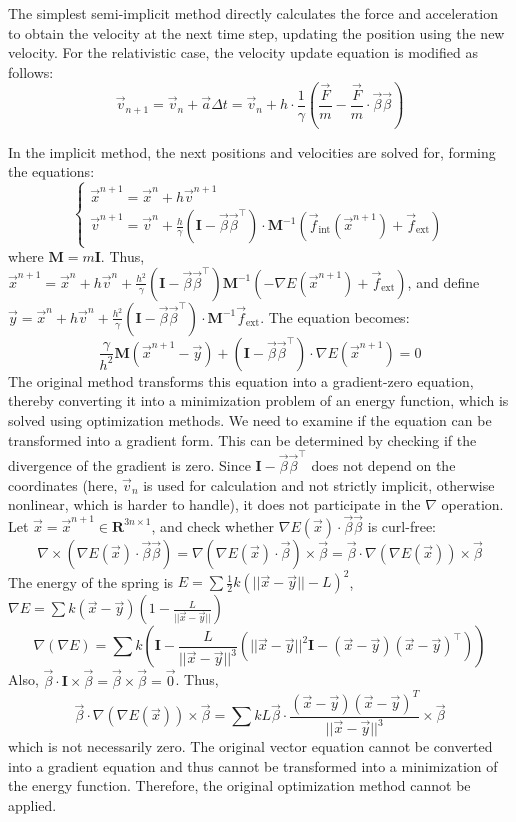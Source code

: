 \documentclass{article}
\begin{document}
The simplest semi-implicit method directly calculates the force and acceleration to obtain the velocity at the next time step, updating the position using the new velocity. For the relativistic case, the velocity update equation is modified as follows:
$$\vec{v}_{n+1} = \vec{v}_n + \vec{a} \Delta t = \vec{v}_n + h \cdot \frac{1} {\gamma} (\frac{\vec{F}} {m} - \frac{\vec{F}} {m} \cdot \vec{\beta} \vec{\beta})$$

In the implicit method, the next positions and velocities are solved for, forming the equations:
$$ \begin{cases} \vec{x}^{n+1} = \vec{x}^{n} + h \vec{v}^{n+1} \\ \vec{v}^{n+1} = \vec{v}^{n} + \frac{h}{\gamma} (\mathbf{I} - \vec{\beta} \vec{\beta}^\top) \cdot \mathbf{M}^{-1} (\vec{f} _ {\text{int}}(\vec{x}^{n+1}) + \vec{f}_{\text{ext}} ) \end{cases} $$
where $\mathbf{M} = m \mathbf{I}$. Thus, $ \vec{x}^{n+1} = \vec{x}^{n} + h \vec{v}^{n} + \frac{h^2}{\gamma} (\mathbf{I} - \vec{\beta} \vec{\beta}^\top) \mathbf{M}^{-1} (-\nabla E(\vec{x}^{n+1}) + \vec{f}_{\text{ext}} ) $, and define $\vec{y} = \vec{x}^n + h \vec{v}^n + \frac{h^2}{\gamma} (\mathbf{I} - \vec{\beta} \vec{\beta}^\top) \cdot \mathbf{M}^{-1} \vec{f}_{\text{ext}}$. The equation becomes:
$$ \frac{\gamma}{h^2} \mathbf{M} (\vec{x}^{n+1} - \vec{y}) + (\mathbf{I} - \vec{\beta} \vec{\beta}^\top) \cdot \nabla E(\vec{x}^{n+1}) = 0 $$
The original method transforms this equation into a gradient-zero equation, thereby converting it into a minimization problem of an energy function, which is solved using optimization methods. We need to examine if the equation can be transformed into a gradient form. This can be determined by checking if the divergence of the gradient is zero. Since $\mathbf{I} - \vec{\beta} \vec{\beta}^\top$ does not depend on the coordinates (here, $\vec{v}_n$ is used for calculation and not strictly implicit, otherwise nonlinear, which is harder to handle), it does not participate in the $\nabla$ operation. Let $\vec{x} = \vec{x}^{n+1} \in \mathbf{R}^{3n \times 1}$, and check whether $\nabla E(\vec{x}) \cdot \vec{\beta} \vec{\beta}$ is curl-free:
$$\nabla \times (\nabla E(\vec{x}) \cdot \vec{\beta} \vec{\beta}) = \nabla (\nabla E(\vec{x}) \cdot \vec{\beta}) \times \vec{\beta} = \vec{\beta} \cdot \nabla (\nabla E(\vec{x})) \times \vec{\beta}$$
The energy of the spring is $E = \sum \frac{1}{2} k (||\vec{x} - \vec{y}|| - L)^2$, $\nabla E = \sum k (\vec{x} - \vec{y}) (1 - \frac{L} {||\vec{x} - \vec{y}||} )$
$$\nabla (\nabla E) = \sum k (\mathbf{I} - \frac{L} {||\vec{x} - \vec{y}||^3} (||\vec{x} - \vec{y}||^2 \mathbf{I} - (\vec{x} - \vec{y}) (\vec{x} - \vec{y})^\top))$$
Also, $\vec{\beta} \cdot \mathbf{I} \times \vec{\beta} = \vec{\beta} \times \vec{\beta} = \vec{0}$. Thus,
$$\vec{\beta} \cdot \nabla (\nabla E(\vec{x})) \times \vec{\beta} = \sum kL \vec{\beta} \cdot \frac{(\vec{x} - \vec{y}) (\vec{x} - \vec{y})^T}{||\vec{x} - \vec{y}||^3} \times \vec{\beta}$$
which is not necessarily zero. The original vector equation cannot be converted into a gradient equation and thus cannot be transformed into a minimization of the energy function. Therefore, the original optimization method cannot be applied.
\end{document}
